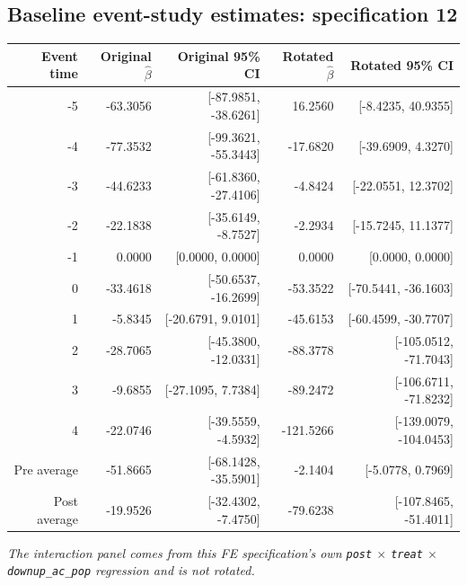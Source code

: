 \documentclass[10pt]{article}
\begin{document}
\subsection*{Baseline event-study estimates: specification 12}
\begin{center}
\scriptsize
\begin{tabular}{r rr rr}
\toprule
Event time & Original $\hat\beta$ & Original 95\% CI & Rotated $\hat\beta$ & Rotated 95\% CI \\
\midrule
-5 & -63.3056 & [-87.9851, -38.6261] & 16.2560 & [-8.4235, 40.9355] \\
-4 & -77.3532 & [-99.3621, -55.3443] & -17.6820 & [-39.6909, 4.3270] \\
-3 & -44.6233 & [-61.8360, -27.4106] & -4.8424 & [-22.0551, 12.3702] \\
-2 & -22.1838 & [-35.6149, -8.7527] & -2.2934 & [-15.7245, 11.1377] \\
-1 & 0.0000 & [0.0000, 0.0000] & 0.0000 & [0.0000, 0.0000] \\
0 & -33.4618 & [-50.6537, -16.2699] & -53.3522 & [-70.5441, -36.1603] \\
1 & -5.8345 & [-20.6791, 9.0101] & -45.6153 & [-60.4599, -30.7707] \\
2 & -28.7065 & [-45.3800, -12.0331] & -88.3778 & [-105.0512, -71.7043] \\
3 & -9.6855 & [-27.1095, 7.7384] & -89.2472 & [-106.6711, -71.8232] \\
4 & -22.0746 & [-39.5559, -4.5932] & -121.5266 & [-139.0079, -104.0453] \\
\midrule
Pre average & -51.8665 & [-68.1428, -35.5901] & -2.1404 & [-5.0778, 0.7969] \\
Post average & -19.9526 & [-32.4302, -7.4750] & -79.6238 & [-107.8465, -51.4011] \\
\bottomrule
\end{tabular}
\end{center}
\medskip
\textit{The interaction panel comes from this FE specification's own \texttt{post} $\times$ \texttt{treat} $\times$ \texttt{downup\_ac\_pop} regression and is not rotated.}
\clearpage
\end{document}
